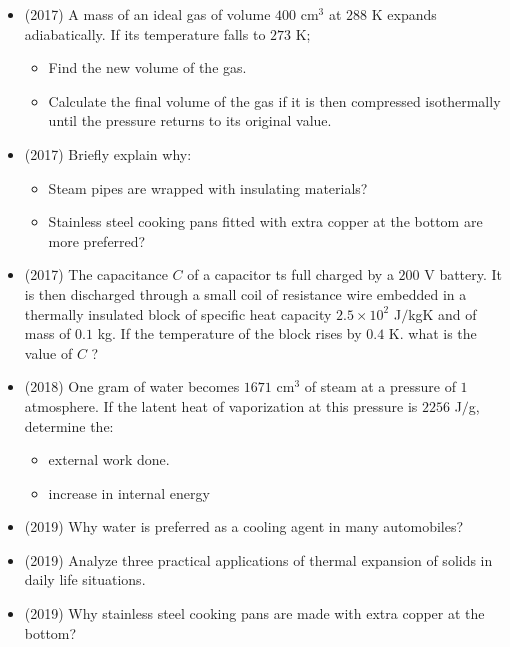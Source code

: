 \documentclass{article}
\begin{document}
\begin{itemize}
\item (2017)  A mass of an ideal gas of volume $ 400$ cm$ ^{3}$ at $ 288$ K expands adiabatically. If its temperature falls to $ 273$ K;
 \begin{itemize}
\item Find the new volume of the gas. 
\item Calculate the final volume of the gas if it is then compressed isothermally until the pressure returns to its original value.
\end{itemize}
\item (2017)  Briefly explain why:
 \begin{itemize}
\item Steam pipes are wrapped with insulating materials?
\item Stainless steel cooking pans fitted with extra copper at the bottom are more preferred?
\end{itemize}
\item (2017)  The capacitance $ C$ of a capacitor ts full charged by a $ 200$ V battery. It is then discharged through a small coil of resistance wire embedded in a thermally insulated block of specific heat capacity $ 2.5 \times 10^{2}$ J$/$kgK and of mass of $ 0.1$ kg.  If the temperature of the block rises by $ 0.4$ K. what is the value of $ C$ ?
\item (2018)  One gram of water becomes $ 1671 $ cm$ ^{3}$ of steam at a pressure of $ 1$ atmosphere. If the latent heat of vaporization at this pressure is $ 2256$ J$/$g, determine the:
 \begin{itemize}
\item external work done. 
\item increase in internal energy 
\end{itemize}
\item (2019)  Why water is preferred as a cooling agent in many automobiles?
\item (2019)  Analyze  three practical applications of thermal expansion of solids in daily life situations.
\item (2019)  Why stainless steel cooking pans are made with extra copper at the bottom?
\end{itemize}
\end{document}
